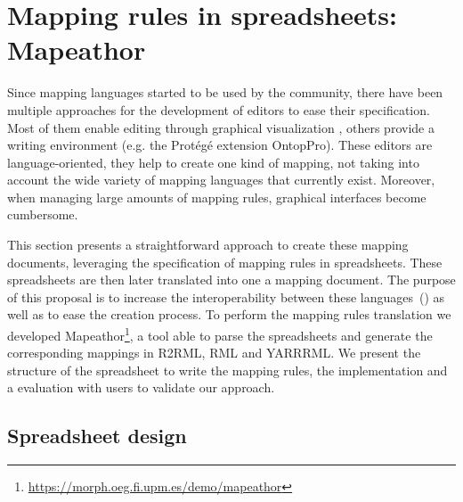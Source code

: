 \section{Mapping rules in spreadsheets: Mapeathor}
\label{sec:chp5_mapeathor}

Since mapping languages started to be used by the community, there have been multiple approaches for the development of editors to ease their specification. Most of them enable editing through graphical visualization \cite{heyvaert2016rmleditor,sicilia2017map}, others provide a writing environment (e.g. the Protégé extension OntopPro). These editors are language-oriented, they help to create one kind of mapping, not taking into account the wide variety of mapping languages that currently exist. Moreover, when managing large amounts of mapping rules, graphical interfaces become cumbersome. %

This section presents a straightforward approach to create these mapping documents, leveraging the  specification of mapping rules in spreadsheets. These spreadsheets are then later translated into one a mapping document. The purpose of this proposal is to increase the interoperability between these languages~(\cite{corcho2020towards}) as well as to ease the creation process. To perform the mapping rules translation we developed Mapeathor\footnote{\label{foot:mapeathor}\url{https://morph.oeg.fi.upm.es/demo/mapeathor}}, a tool able to parse the spreadsheets and generate the corresponding mappings in R2RML, RML and YARRRML. We present the structure of the spreadsheet to write the mapping rules, the implementation and a evaluation with users to validate our approach.

\subsection{Spreadsheet design}
\label{sec:chp5_spreadsheet_design}


